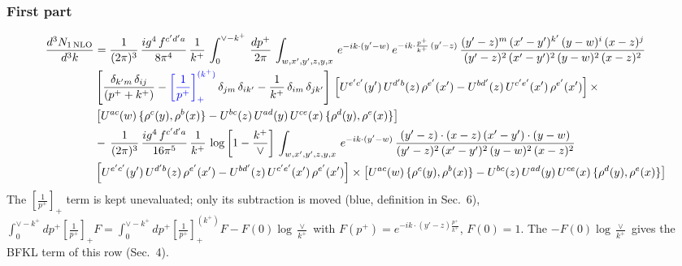\documentclass[9pt]{article}
\newcommand{\new}[1]{{\color{blue}#1}}
\numberwithin{equation}{section}
\begin{document}
 \subsubsection{First part}
 \begin{align}
     \frac{d^{3}N_{1\,\rm NLO}}{d^{3}k} & = \frac{1}{(2\pi)^{3}}\, \frac{ig^{4}\,f^{c'd'a}}{8\pi^{4}}\, \frac{1}{k^{+}}\,\int_{0}^{\vee-k^{+}}\,  \frac{dp^{+}}{2\pi}\, \int_{w,x',y',z,y,x}\, e^{-ik\cdot (y'-w)}\, e^{-ik\cdot \frac{p^{+}}{k^{+}}\,(y'-z)}\,\frac{(y'-z)^{m}\,(x'-y')^{k'}\,(y-w)^{i}\,(x-z)^{j}}{(y'-z)^{2}\,(x'-y')^{2}\,(y-w)^{2}\,(x-z)^{2}}\notag \\ & \left[\frac{\delta_{k'm}\,\delta_{ij}}{(p^{+}+k^{+})}-\new{\left[\frac{1}{p^{+}}\right]_{+}^{(k^{+})}}\,\delta_{jm}\,\delta_{ik'}-\frac{1}{k^{+}}\, \delta_{im}\, \delta_{jk'}\right]\, \left[U^{e'c'}(y')\,U^{d'b}(z)\,\rho^{e'}(x')-U^{bd'}(z)\,U^{c'e'}(x')\,\rho^{e'}(x')\right]\times\notag \\ &  \left[U^{ac}(w)\, \{\rho^{c}(y),\rho^{b}(x)\}-U^{bc}(z)\,U^{ad}(y)\,U^{ce}(x)\,\{\rho^{d}(y),\rho^{e}(x)\}\right]\notag \\ & -\,\frac{1}{(2\pi)^{3}}\, \frac{ig^{4}\,f^{c'd'a}}{16\pi^{5}}\, \frac{1}{k^{+}}\, \log{\left[1-\frac{k^{+}}{\vee}\right]}\, \int_{w,x',y',z,y,x}\, e^{-ik\cdot (y'-w)}\,\frac{(y'-z)\cdot (x-z)\,(x'-y')\cdot (y-w)}{(y'-z)^{2}\,(x'-y')^{2}\,(y-w)^{2}\,(x-z)^{2}}\notag \\ &  \left[U^{e'c'}(y')\,U^{d'b}(z)\,\rho^{e'}(x')-U^{bd'}(z)\,U^{c'e'}(x')\,\rho^{e'}(x')\right]\times  \left[U^{ac}(w)\, \{\rho^{c}(y),\rho^{b}(x)\}-U^{bc}(z)\,U^{ad}(y)\,U^{ce}(x)\,\{\rho^{d}(y),\rho^{e}(x)\}\right]
\end{align}
\new{The $\left[\frac{1}{p^+}\right]_+$ term is kept unevaluated; only its subtraction is moved (blue, definition in Sec.~6), $\int_0^{\vee-k^+}dp^+\left[\frac{1}{p^+}\right]_+F=\int_0^{\vee-k^+}dp^+\left[\frac{1}{p^+}\right]_+^{(k^+)}F-F(0)\log\frac{\vee}{k^+}$ with $F(p^+)=e^{-ik\cdot(y'-z)\frac{p^+}{k^+}}$, $F(0)=1$. The $-F(0)\log\frac{\vee}{k^+}$ gives the BFKL term of this row (Sec.~4).}
 
\end{document}

